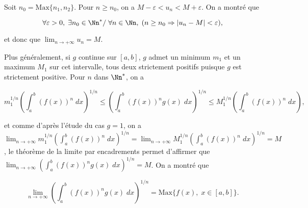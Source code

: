 {{Soit $n_0=\mbox{Max}\{n_1,n_2\}$. Pour $n\geq n_0$, on a $M-\varepsilon<u_n<M+\varepsilon$. On a montré que 

$$\forall\varepsilon>0,\;\exists n_0\in\Nn^*/\;\forall n\in\Nn,\;(n\geq n_0\Rightarrow|u_n-M|<\varepsilon),$$

et donc que $\lim_{n\rightarrow +\infty}u_n=M$.

Plus généralement, si $g$ continue sur $[a,b]$, $g$ admet un minimum $m_1$ et un maximum $M_1$ sur cet intervalle, tous deux strictement positifs puisque $g$ est strictement positive. Pour $n$ dans $\Nn^*$, on a
 
$$m_1^{1/n}\left(\int_{a}^{b}(f(x))^n\;dx\right)^{1/n}\leq\left(\int_{a}^{b}(f(x))^ng(x)\;dx\right)^{1/n}\leq M_1^{1/n}\left(\int_{a}^{b}(f(x))^n\;dx\right),$$

et comme d'après l'étude du cas $g=1$, on a $\lim_{n\rightarrow +\infty}m_1^{1/n}\left(\int_{a}^{b}(f(x))^n\;dx\right)^{1/n}=\lim_{n\rightarrow +\infty}M_1^{1/n}\left(\int_{a}^{b}(f(x))^n\;dx\right)^{1/n}=M$, le théorème de la limite par encadrements permet d'affirmer que $\lim_{n\rightarrow +\infty}\left(\int_{a}^{b}(f(x))^ng(x)\;dx\right)^{1/n}=M$. On a montré que 

$$\lim_{n\rightarrow +\infty}\left(\int_{a}^{b}(f(x))^ng(x)\;dx\right)^{1/n}=\mbox{Max}\{f(x),\;x\in[a,b]\}.$$
}
}
